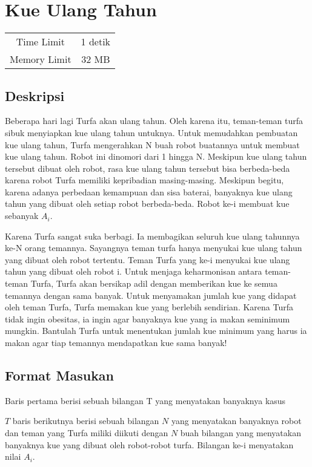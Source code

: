 \documentclass{article}
\begin{document}
\section*{\hfil Kue Ulang Tahun\hfil}

\begin{center}
\begin{tabular}{ |cc| } 
 \hline
 Time Limit & 1 detik \\ 
 Memory Limit & 32 MB \\
 \hline
\end{tabular}
\end{center}

\subsection*{Deskripsi}
\par Beberapa hari lagi Turfa akan ulang tahun. Oleh karena itu, teman-teman turfa sibuk menyiapkan kue ulang tahun untuknya. Untuk memudahkan pembuatan kue ulang tahun, Turfa mengerahkan N buah robot buatannya untuk membuat kue ulang tahun. Robot ini dinomori dari 1 hingga N. Meskipun kue ulang tahun tersebut dibuat oleh robot, rasa kue ulang tahun tersebut bisa berbeda-beda karena robot Turfa memiliki kepribadian masing-masing. Meskipun begitu, karena adanya perbedaan kemampuan dan sisa baterai, banyaknya kue ulang tahun yang dibuat oleh setiap robot berbeda-beda. Robot ke-i membuat kue sebanyak $A_i$.
\par Karena Turfa sangat suka berbagi. Ia membagikan seluruh kue ulang tahunnya ke-N orang temannya. Sayangnya teman turfa hanya menyukai kue ulang tahun yang dibuat oleh robot tertentu. Teman Turfa yang ke-i menyukai kue ulang tahun yang dibuat oleh robot i. Untuk menjaga keharmonisan antara teman-teman Turfa, Turfa akan bersikap adil dengan memberikan kue ke semua temannya dengan sama banyak. Untuk menyamakan jumlah kue yang didapat oleh teman Turfa, Turfa memakan kue yang berlebih sendirian. Karena Turfa tidak ingin obesitas, ia ingin agar banyaknya kue yang ia makan seminimum mungkin. Bantulah Turfa untuk menentukan jumlah kue minimum yang harus ia makan agar tiap temannya mendapatkan kue sama banyak!

\subsection*{Format Masukan}
\par Baris pertama berisi sebuah bilangan T yang menyatakan banyaknya kasus
\par $T$ baris berikutnya berisi sebuah bilangan $N$ yang menyatakan banyaknya robot dan teman yang Turfa miliki diikuti dengan $N$ buah bilangan yang menyatakan banyaknya kue yang dibuat oleh robot-robot turfa. Bilangan ke-i menyatakan nilai $A_i$.
\end{document}
